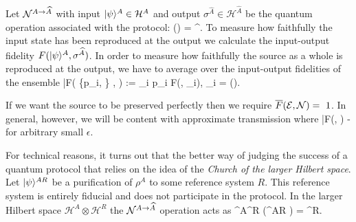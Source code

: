 \documentclass[aps,11pt,twoside,letterpaper]{article}
\def\E{\mathcal{E}}
\def\cH{\mathcal{H}}
\theoremstyle{plain}
\theoremstyle{definition}
\begin{document}
			Let ${\cal N}^{A \to \widehat{A}}$ with input $\ket{\psi}^A \in \cH^A$ and output 
		    $\sigma^{\widehat{A}} \in \cH^{\widehat{A}}$ be the quantum operation associated with the protocol:
			\be
				\cN(\proj{\psi}) = \sigma^{}.
			\ee
			To measure how faithfully the input state has been reproduced at the output we calculate the 
			input-output fidelity $F(| \psi \rangle^A, \sigma^{\widehat{A}})$. 
			In order to measure how faithfully the source as a whole is reproduced at the output, 
			we have to average over the input-output fidelities of the ensemble
			\be
				\bar{F}\!\left( \{p_i,  \}  , \cN\right) :=	\sum_i	p_i F(, \sigma_i), 
				\qquad \sigma_i = \cN().
			\ee

			If we want the source to be preserved perfectly then we require $\bar{F}(\E, \cN)=~1$.
			In general, however, we will be content with approximate transmission where
			\be \label{eqn:MixedFidDef}
				\bar{F}\!\left(\E, \cN\right)  - \epsilon
			\ee
			for arbitrary small $\epsilon$.

			
            For technical reasons, it turns out that the better way of  
            judging the success of a quantum protocol 
			that relies on the idea of the \emph{Church of the larger Hilbert space}.
			Let $| \psi \rangle^{AR}$ be a purification of $\rho^A$ to some reference system $R$. 
			This reference system is entirely fiducial and does not participate in the protocol.
			In the larger Hilbert space $\cH^A\otimes\cH^R$ the ${\cal N}^{A \to \widehat{A}}$ operation acts as
			\be
				\cN^{A\to {}}\!\!\otimes\!\id^R \!\left(\proj{\psi}^{AR} \right) = \sigma^{R}.
			\ee
			
\end{document}
